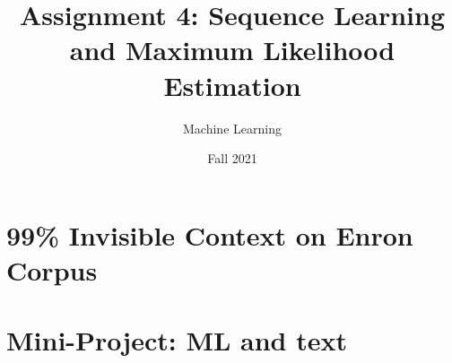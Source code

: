 \documentclass[assignment04_Solutions]{subfiles}
\title{Assignment 4: Sequence Learning and Maximum Likelihood Estimation}
\author{Machine Learning}
\date{Fall 2021}
\begin{document}
\maketitle
\thispagestyle{firstpage}


\begin{learningobjectives}
\bi
\item 
\ei
\end{learningobjectives}

\section{99\% Invisible Context on Enron Corpus}

\section{Mini-Project: ML and text}

\end{document}
